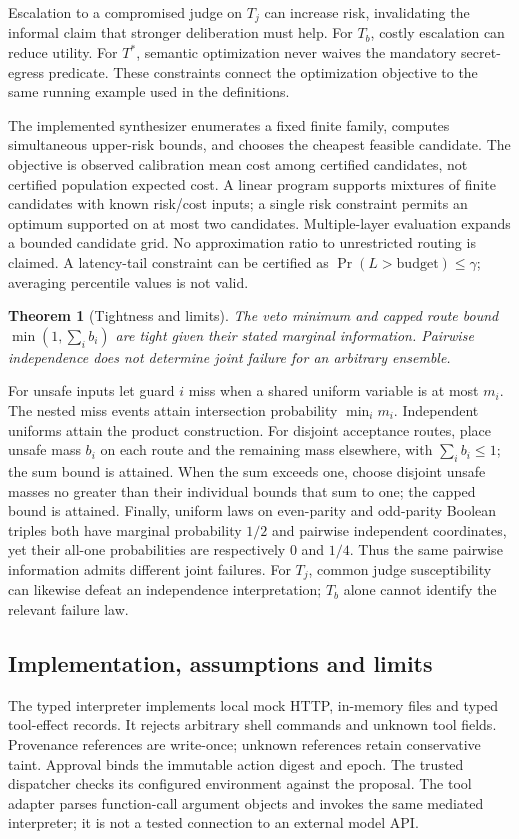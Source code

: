 \documentclass[lettersize,journal]{IEEEtran}
\newtheorem{theorem}{Theorem}
\begin{document}
Escalation to a compromised judge on $T_j$ can increase risk, invalidating the
informal claim that stronger deliberation must help. For $T_b$, costly
escalation can reduce utility. For $T^*$, semantic optimization never waives
the mandatory secret-egress predicate. These constraints connect the
optimization objective to the same running example used in the definitions.

The implemented synthesizer enumerates a fixed finite family, computes
simultaneous upper-risk bounds, and chooses the cheapest feasible candidate.
The objective is observed calibration mean cost among certified candidates,
not certified population expected cost. A linear program supports mixtures of
finite candidates with known risk/cost inputs; a single risk constraint permits
an optimum supported on at most two candidates. Multiple-layer evaluation
expands a bounded candidate grid. No approximation ratio to unrestricted
routing is claimed. A latency-tail constraint can be certified as
$\Pr(L>\mathrm{budget})\leq\gamma$; averaging percentile values is not valid.

\begin{theorem}[Tightness and limits]
\label{thm:limits}
The veto minimum and capped route bound $\min(1,\sum_i b_i)$ are tight given their
stated marginal information. Pairwise independence does not determine joint
failure for an arbitrary ensemble.
\end{theorem}
\begin{IEEEproof}
For unsafe inputs let guard $i$ miss when a shared uniform variable is at
most $m_i$. The nested miss events attain intersection probability
$\min_i m_i$. Independent uniforms attain the product construction. For
disjoint acceptance routes, place unsafe mass $b_i$ on each route and the
remaining mass elsewhere, with $\sum_i b_i\leq1$; the sum bound is attained.
When the sum exceeds one, choose disjoint unsafe masses no greater than their
individual bounds that sum to one; the capped bound is attained.
Finally, uniform laws on even-parity and odd-parity Boolean triples both
have marginal probability $1/2$ and pairwise independent coordinates, yet
their all-one probabilities are respectively $0$ and $1/4$. Thus the same
pairwise information admits different joint failures. For $T_j$, common
judge susceptibility can likewise defeat an independence interpretation;
$T_b$ alone cannot identify the relevant failure law.
\end{IEEEproof}

\subsection{Implementation, assumptions and limits}
The typed interpreter implements local mock HTTP, in-memory files and typed
tool-effect records. It rejects arbitrary shell commands and unknown tool
fields. Provenance references are write-once; unknown references retain
conservative taint. Approval binds the immutable action digest and epoch.
The trusted dispatcher checks its configured environment against the proposal.
The tool adapter parses function-call argument objects and invokes the same
mediated interpreter; it is not a tested connection to an external model API.
\end{document}
